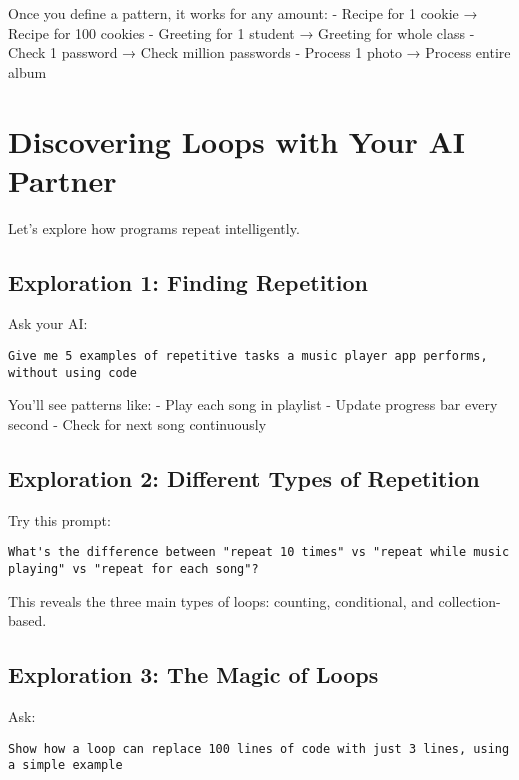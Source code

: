 \documentclass[
  letterpaper,
  DIV=11,
  numbers=noendperiod,
  oneside]{scrreprt}
\begin{document}
Once you define a pattern, it works for any amount: - Recipe for 1
cookie → Recipe for 100 cookies - Greeting for 1 student → Greeting for
whole class - Check 1 password → Check million passwords - Process 1
photo → Process entire album

\section{Discovering Loops with Your AI
Partner}\label{discovering-loops-with-your-ai-partner}

Let's explore how programs repeat intelligently.

\subsection{Exploration 1: Finding
Repetition}\label{exploration-1-finding-repetition}

Ask your AI:

\begin{verbatim}
Give me 5 examples of repetitive tasks a music player app performs, without using code
\end{verbatim}

You'll see patterns like: - Play each song in playlist - Update progress
bar every second - Check for next song continuously

\subsection{Exploration 2: Different Types of
Repetition}\label{exploration-2-different-types-of-repetition}

Try this prompt:

\begin{verbatim}
What's the difference between "repeat 10 times" vs "repeat while music playing" vs "repeat for each song"?
\end{verbatim}

This reveals the three main types of loops: counting, conditional, and
collection-based.

\subsection{Exploration 3: The Magic of
Loops}\label{exploration-3-the-magic-of-loops}

Ask:

\begin{verbatim}
Show how a loop can replace 100 lines of code with just 3 lines, using a simple example
\end{verbatim}
\end{document}

